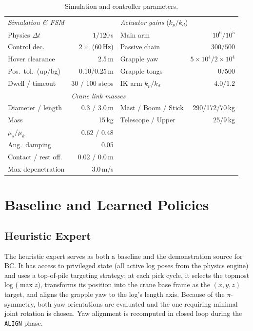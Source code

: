 \documentclass[conference]{IEEEtran}
\begin{document}
\begin{table}[t]
\centering
\caption{Simulation and controller parameters.}
\label{tab:sim_params}
\setlength{\tabcolsep}{2pt}
\footnotesize
\begin{tabular}{@{}lr@{\hskip 8pt}lr@{}}
\toprule
\multicolumn{2}{l}{\textit{Simulation \& FSM}} & \multicolumn{2}{l}{\textit{Actuator gains} ($k_p/k_d$)} \\[2pt]
Physics $\Delta t$ & $1/120$\,s & Main arm & $10^{6}/10^{5}$ \\
Control dec. & $2\times$ (60\,Hz) & Passive chain & $300/500$ \\
Hover clearance & 2.5\,m & Grapple yaw & $5\!\times\!10^{4}/2\!\times\!10^{4}$ \\
Pos.\ tol.\ (up/bg) & 0.10/0.25\,m & Grapple tongs & $0/500$ \\
Dwell / timeout & 30 / 100 steps & IK arm $k_p/k_d$ & $4.0/1.2$ \\
\addlinespace[3pt]
\multicolumn{2}{l}{\textit{Log properties}} & \multicolumn{2}{l}{\textit{Crane link masses}} \\[2pt]
Diameter / length & 0.3 / 3.0\,m & Mast / Boom / Stick & 290/172/70\,kg \\
Mass & 15\,kg & Telescope / Upper & 25/9\,kg \\
$\mu_s / \mu_k$ & 0.62 / 0.48 & & \\
Ang.\ damping & 0.05 & & \\
Contact / rest off. & 0.02 / 0.0\,m & & \\
Max depenetration & 3.0\,m/s & & \\
\bottomrule
\end{tabular}
\end{table}

\section{Baseline and Learned Policies}

\subsection{Heuristic Expert}
\label{sec:expert}
The heuristic expert serves as both a baseline and the demonstration source for BC.
It has access to privileged state (all active log poses from the physics engine) and uses a top-of-pile targeting strategy: at each pick cycle, it selects the topmost log ($\max z$), transforms its position into the crane base frame as the $(x,y,z)$ target, and aligns the grapple yaw to the log's length axis.
Because of the $\pi$-symmetry, both yaw orientations are evaluated and the one requiring minimal joint rotation is chosen.
Yaw alignment is recomputed in closed loop during the \texttt{ALIGN} phase.
\end{document}
